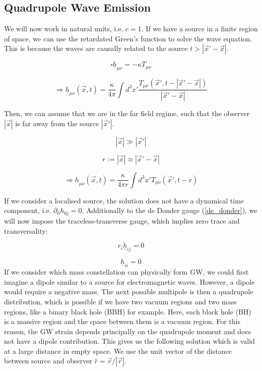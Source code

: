 \subsection{Quadrupole Wave Emission}
We will now work in natural units, i.e. $c=1$. If we have a source in a finite region of space, we can use the retardated Green's function to solve the wave equation. This is because the waves are causally related to the source $t> |\vec{x}'-\vec{x}|$.

\begin{equation}
    \square \underline{h}_{\mu\nu}=-\kappa T_{\mu\nu}
\end{equation}

\begin{equation}
    \Rightarrow \underline{h}_{\mu\nu}(\vec{x}, t) = \frac{\kappa}{4\pi} \int d^3 x' \frac{T_{\mu\nu}(\vec{x}', t-|\vec{x}'-\vec{x}|)}{|\vec{x}'-\vec{x}|}
\end{equation}

Then, we can assume that we are in the far field regime, such that the observer $|\vec{x}|$ is far away from the source $|\vec{x}'|$.

\begin{equation}
    |\vec{x}| \gg |\vec{x}'|
\end{equation}

\begin{equation}
    r:= |\vec{x}| \approx |\vec{x}'-\vec{x}|
\end{equation}

\begin{equation}
    \Rightarrow \underline{h}_{\mu\nu}(\vec{x}, t) = \frac{\kappa}{4\pi r} \int d^3 x' T_{\mu\nu}(\vec{x}', t-r)
\end{equation}

If we consider a localised source, the solution does not have a dynamical time component, i.e. $\partial_0 h_{0j} = 0$.
Additionally to the de Donder gauge (\ref{de_donder}), we will now impose the traceless-transverse gauge, which implies zero trace and transversality:

\begin{equation}
    r_i \underline{h}_{ij} = 0
\end{equation}

\begin{equation}
    \underline{h}_{ii} = 0
\end{equation}
If we consider which mass constellation can physically form GW, we could first imagine a dipole similar to a source for electromagnetic waves. However, a dipole would require a negative mass. The next possible multipole is then a quadrupole distribution, which is possible if we have two vacuum regions and two mass regions, like a binary black hole (BBH) for example. Here, each black hole (BH) is a massive region and the space between them is a vacuum region. For this reason, the GW strain depends principally on the quadrupole moment and does not have a dipole contribution. This gives us the following solution which is valid at a large distance in empty space. We use the unit vector of the distance between source and observer $\hat{r}=\vec{r}/|\vec{r}|$.

